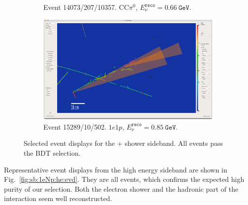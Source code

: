 \begin{figure}[H]
\begin{center}
\begin{subfigure}{0.45\textwidth}
    \caption{Event 14073/207/10357. CC$\pi^0$, $E_\nu^{\texttt{reco}} = 0.66~\texttt{GeV}$.}
    \end{subfigure}
    \begin{subfigure}{0.45\textwidth}
    \includegraphics[width=1.00\textwidth]{Sidebands/Figures/1eNp/TwoShower/EVD/evt-15289-10-502_reco.png}
    \caption{Event 15289/10/502. $1e1p$, $E_\nu^{\texttt{reco}} = 0.85~\texttt{GeV}$.}
    \end{subfigure}
    \caption{\label{fig:sb:1eNp:twopshr:evd} Selected event displays for the + shower sideband. All events pass the BDT selection.}
    \end{center}
\end{figure}

Representative event displays from the \npsel high energy sideband are shown in Fig.~\ref{fig:sb:1eNp:he:evd}. They are all \npsel events, which confirms the expected high purity of our selection. Both the electron shower and the hadronic part of the interaction seem well reconstructed.

